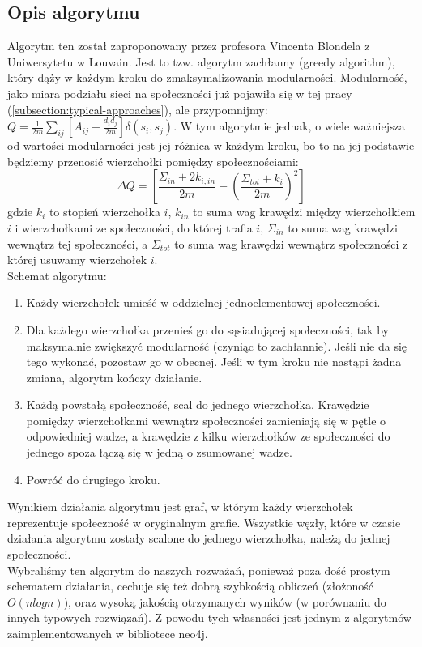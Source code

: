 \documentclass{article}
\begin{document}
\subsection{Opis algorytmu}
Algorytm ten został zaproponowany przez profesora Vincenta Blondela z Uniwersytetu w Louvain. Jest to tzw. algorytm zachłanny (greedy algorithm), który dąży w każdym kroku do zmaksymalizowania modularności. Modularność, jako miara podziału sieci na społeczności już pojawiła się w tej pracy (\ref{subsection:typical-approaches}), ale przypomnijmy: $Q= \frac{1}{2m} \sum\limits_{ij} [A_{ij} - \frac{d_i d_j}{2m}]\delta(s_i,s_j)$. W tym algorytmie jednak, o wiele ważniejsza od wartości modularności jest jej różnica w każdym kroku, bo to na jej podstawie będziemy przenosić wierzchołki pomiędzy społecznościami:  $$\Delta Q = [\frac{\Sigma_{in} +2k_{i,in}}{2m} - (\frac{\Sigma_{tot} + k_i}{2m})^2]$$ gdzie $k_i$ to stopień wierzchołka $i$, $k_{in}$ to suma wag krawędzi między wierzchołkiem $i$ i wierzchołkami ze społeczności, do której trafia $i$, $\Sigma_{in}$ to suma wag krawędzi wewnątrz tej społeczności, a $\Sigma_{tot}$ to suma wag krawędzi wewnątrz społeczności z której usuwamy wierzchołek $i$. \\
Schemat algorytmu:
\begin{enumerate}
\item Każdy wierzchołek umieść w oddzielnej jednoelementowej społeczności.
\item Dla każdego wierzchołka przenieś go do sąsiadującej społeczności, tak by maksymalnie zwiększyć modularność (czyniąc to zachłannie). Jeśli nie da się tego wykonać, pozostaw go w obecnej. Jeśli w tym kroku nie nastąpi żadna zmiana, algorytm kończy działanie.
\item Każdą powstałą społeczność, scal do jednego wierzchołka. Krawędzie pomiędzy wierzchołkami wewnątrz społeczności zamieniają się w pętle o odpowiedniej wadze, a krawędzie z kilku wierzchołków ze społeczności do jednego spoza łączą się w jedną o zsumowanej wadze.
\item Powróć do drugiego kroku.
\end{enumerate}
Wynikiem działania algorytmu jest  graf, w którym każdy wierzchołek reprezentuje społeczność w oryginalnym grafie. Wszystkie węzły, które w czasie działania algorytmu zostały scalone do jednego wierzchołka, należą do jednej społeczności. \\ 

Wybraliśmy ten algorytm do naszych rozważań, ponieważ poza dość prostym schematem działania, cechuje się też dobrą szybkością obliczeń (złożoność $O(nlogn)$), oraz wysoką jakością otrzymanych wyników (w porównaniu do innych typowych rozwiązań). Z powodu tych własności jest jednym z algorytmów zaimplementowanych w bibliotece neo4j.
\end{document}
